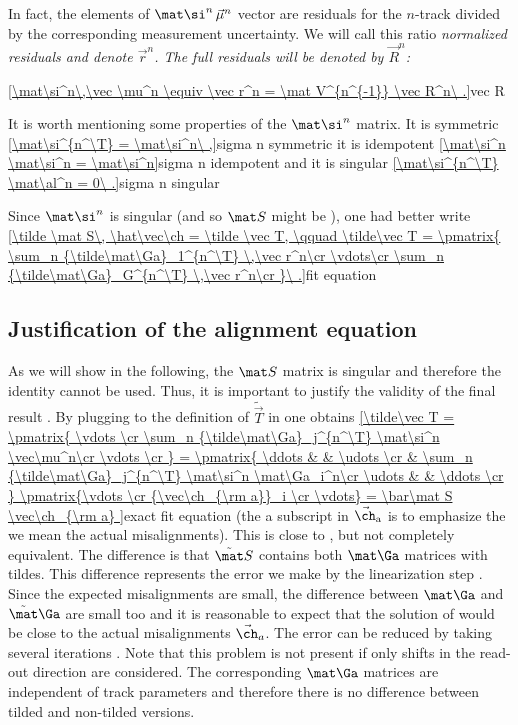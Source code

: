 In fact, the elements of $\mat\si^n\,\vec \mu^n$ vector are residuals for the $n$-track divided by the corresponding measurement uncertainty. We will call this ratio \em{normalized} residuals and denote $\vec r^n$. The full residuals will be denoted by $\vec R^n$:

\eqref{\mat\si^n\,\vec \mu^n \equiv \vec r^n = \mat V^{n^{-1}} \vec R^n\ .}{vec R}

It is worth mentioning some properties of the $\mat\si^n$ matrix. It is symmetric
\eqref{\mat\si^{n^\T} = \mat\si^n\ ,}{sigma n symmetric}
it is idempotent
\eqref{\mat\si^n \mat\si^n = \mat\si^n}{sigma n idempotent}
and it is singular
\eqref{\mat\si^{n^\T} \mat\al^n = 0\ .}{sigma n singular}

Since $\mat\si^n$ is singular (and so $\mat S$ might be ), one had better write
\eqref{\tilde \mat S\, \hat\vec\ch = \tilde \vec T, \qquad 
\tilde\vec T = \pmatrix{
\sum_n {\tilde\mat\Ga}_1^{n^\T} \,\vec r^n\cr
\vdots\cr
\sum_n {\tilde\mat\Ga}_G^{n^\T} \,\vec r^n\cr
}\ .}{fit equation}



\subsection[al fit eq]{Justification of the alignment equation}

As we will show in the following, the $\mat S$ matrix is singular and therefore the identity  cannot be used. Thus, it is important to justify the validity of the final result . By plugging  to the definition of $\tilde\vec T$ in  one obtains
\eqref{\tilde\vec T =
\pmatrix{
\vdots \cr
\sum_n {\tilde\mat\Ga}_j^{n^\T} \mat\si^n \vec\mu^n\cr
\vdots \cr
}
=
\pmatrix{
\ddots & & \udots \cr
 & \sum_n {\tilde\mat\Ga}_j^{n^\T} \mat\si^n \mat\Ga_i^n\cr
\udots & & \ddots \cr
}
\pmatrix{\vdots \cr {\vec\ch_{\rm a}}_i \cr \vdots}
=
\bar\mat S \vec\ch_{\rm a}
}{exact fit equation}
(the a subscript in $\vec\ch_{\rm a}$ is to emphasize the we mean the actual misalignments). This is close to , but not completely equivalent. The difference is that $\tilde\mat S$ contains both $\mat\Ga$ matrices with tildes. This difference represents the error we make by the linearization step . Since the expected misalignments are small, the difference between $\mat\Ga$ and $\tilde\mat\Ga$ are small too and it is reasonable to expect that the solution of  would be close to the actual misalignments $\vec\ch_a$. The error can be reduced by taking several iterations . Note that this problem is not present if only shifts in the read-out direction are considered. The corresponding $\mat\Ga$ matrices are independent of track parameters and therefore there is no difference between tilded and non-tilded versions.

